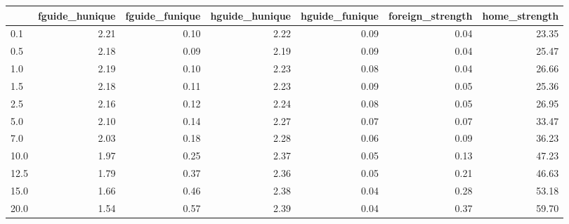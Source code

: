 \begin{tabular}{lrrrrrr}
\toprule
 & fguide_hunique & fguide_funique & hguide_hunique & hguide_funique & foreign_strength & home_strength \\
\midrule
0.1 & 2.21 & 0.10 & 2.22 & 0.09 & 0.04 & 23.35 \\
0.5 & 2.18 & 0.09 & 2.19 & 0.09 & 0.04 & 25.47 \\
1.0 & 2.19 & 0.10 & 2.23 & 0.08 & 0.04 & 26.66 \\
1.5 & 2.18 & 0.11 & 2.23 & 0.09 & 0.05 & 25.36 \\
2.5 & 2.16 & 0.12 & 2.24 & 0.08 & 0.05 & 26.95 \\
5.0 & 2.10 & 0.14 & 2.27 & 0.07 & 0.07 & 33.47 \\
7.0 & 2.03 & 0.18 & 2.28 & 0.06 & 0.09 & 36.23 \\
10.0 & 1.97 & 0.25 & 2.37 & 0.05 & 0.13 & 47.23 \\
12.5 & 1.79 & 0.37 & 2.36 & 0.05 & 0.21 & 46.63 \\
15.0 & 1.66 & 0.46 & 2.38 & 0.04 & 0.28 & 53.18 \\
20.0 & 1.54 & 0.57 & 2.39 & 0.04 & 0.37 & 59.70 \\
\bottomrule
\end{tabular}
